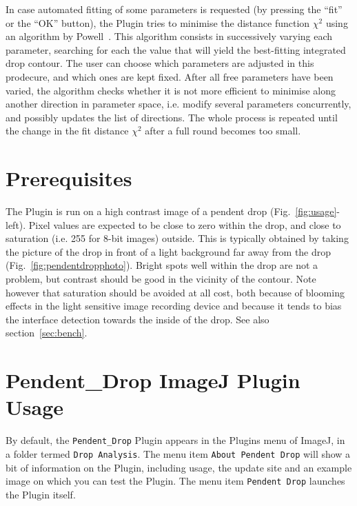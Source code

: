 \documentclass[fleqn]{scrartcl}
\newcommand{\gouttependante}{\texttt{Pendent\_Drop}\xspace}
\begin{document}
 In case
automated fitting of some parameters is requested (by pressing the
``fit'' or the ``OK'' button), the Plugin tries to minimise the
distance function $\chi^2$ using an algorithm by
Powell~\cite{Powell1965,Brandt1992}. This algorithm consists in
successively varying each parameter, searching for each the value that
will yield the best-fitting integrated drop contour. The user can
choose which parameters are adjusted in this prodecure, and which ones
are kept fixed. After all free parameters have been varied, the
algorithm checks whether it is not more efficient to minimise along
another direction in parameter space, i.e. modify several parameters
concurrently, and possibly updates the list of directions. The whole
process is repeated until the change in the fit distance $\chi^2$
after a full round becomes too small.


\appendix


\section{Prerequisites}
\label{sec:prerequisites}

The Plugin is run on a high contrast image of a pendent drop
(Fig.~\ref{fig:usage}-left). Pixel values are expected to be close to
zero within the drop, and close to saturation (i.e. 255 for 8-bit
images) outside. This is typically obtained by taking the picture of
the drop in front of a light background far away from the drop
(Fig.~\ref{fig:pendentdropphoto}). Bright spots well within the drop
are not a problem, but contrast should be good in the vicinity of the
contour. Note however that saturation should be avoided at all cost,
both because of blooming effects in the light sensitive image
recording device and because it tends to bias the interface detection
towards the inside of the drop. See also section~\ref{sec:bench}.


\section{Pendent\_Drop ImageJ Plugin Usage}
\label{sec:usage}

By default, the \gouttependante Plugin appears in the Plugins menu of
ImageJ, in a folder termed \texttt{Drop Analysis}. The menu item
\texttt{About Pendent Drop} will show a bit of information on the
Plugin, including usage, the update site and an example image on which
you can test the Plugin. The menu item \texttt{Pendent Drop} launches
the Plugin itself.
\end{document}
